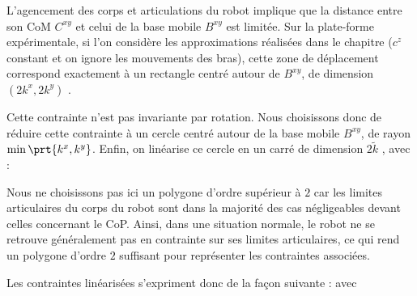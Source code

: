 				
				\label{section.ctr_body_3_roues}
			
					
					L'agencement des corps et articulations du robot implique que la distance entre son CoM $C^{xy}$ et celui de la base mobile $B^{xy}$ est limitée.
					Sur la plate-forme expérimentale, si l'on considère les approximations réalisées dans le chapitre  ($c^z$ constant et on ignore les mouvements des bras),
					cette zone de déplacement correspond exactement à un rectangle centré autour de $B^{xy}$, de dimension $(2k^x, 2k^y)$ .
					
					Cette contrainte n'est pas invariante par rotation.
					Nous choisissons donc de réduire cette contrainte à un cercle centré autour de la base mobile $B^{xy}$, de rayon $\min\prt{k^x, k^y}$.
					Enfin, on linéarise ce cercle en un carré de dimension $2\tilde{k}$ , avec :
					
					Nous ne choisissons pas ici un polygone d'ordre supérieur à $2$ car les limites articulaires du corps du robot sont dans la majorité des cas négligeables devant celles concernant le CoP.
					Ainsi, dans une situation normale, le robot ne se retrouve généralement pas en contrainte sur ses limites articulaires, ce qui rend un polygone d'ordre $2$ suffisant pour représenter les contraintes associées.
					
					Les contraintes linéarisées s'expriment donc de la façon suivante :
					avec
					

